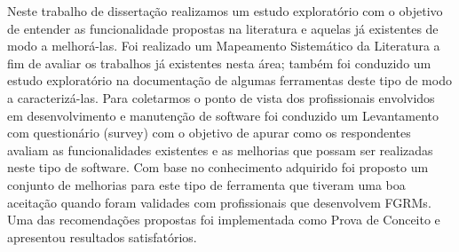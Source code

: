 Neste trabalho de dissertação realizamos um estudo exploratório com o objetivo
de entender as funcionalidade propostas na literatura e aquelas já existentes
de modo a melhorá-las. Foi realizado um Mapeamento Sistemático da Literatura a
fim de avaliar os trabalhos já existentes nesta área; também foi conduzido um
estudo exploratório na documentação de algumas ferramentas deste tipo de modo a
caracterizá-las. Para coletarmos o ponto de vista dos profissionais envolvidos
em desenvolvimento e manutenção de software foi conduzido um Levantamento com
questionário (survey) com o objetivo de apurar como os respondentes  avaliam as
funcionalidades existentes e as melhorias que possam ser realizadas neste tipo
de software. Com base no conhecimento adquirido foi proposto um conjunto de
melhorias para este tipo de ferramenta que tiveram uma boa aceitação quando
foram validades com profissionais que desenvolvem FGRMs. Uma das recomendações
propostas foi implementada como Prova de Conceito e apresentou resultados
satisfatórios.

